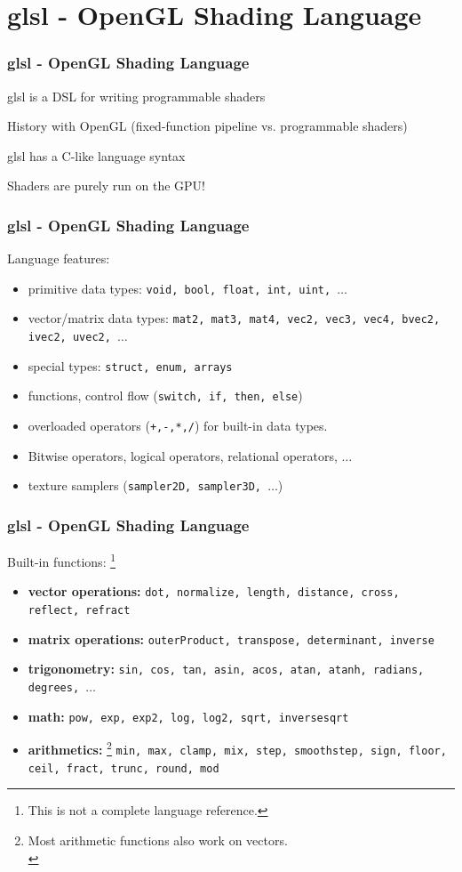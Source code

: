 \documentclass{beamer}
\begin{document}
%
%
%
\section{glsl - OpenGL Shading Language}

\begin{frame}
\frametitle{glsl - OpenGL Shading Language}
glsl is a DSL for writing programmable shaders

History with OpenGL (fixed-function pipeline vs. programmable shaders)

glsl has a C-like language syntax

Shaders are purely run on the GPU!
\end{frame}


%
%
%
\begin{frame}
\frametitle{glsl - OpenGL Shading Language}
Language features:

\begin{itemize}
\item primitive data types: \texttt{void, bool, float, int, uint, $\ldots$}
\item vector/matrix data types: \texttt{mat2, mat3, mat4, vec2, vec3, vec4,
bvec2, ivec2, uvec2, $\ldots$}
\item special types: \texttt{struct, enum, arrays}
\item functions, control flow (\texttt{switch, if, then, else})
\item overloaded operators (\texttt{+,-,*,/}) for built-in data types.
\item Bitwise operators, logical operators, relational operators, $\ldots$
\item texture samplers (\texttt{sampler2D, sampler3D, $\ldots$})
\end{itemize}
\end{frame}


%
%
%
\begin{frame}
\frametitle{glsl - OpenGL Shading Language}
Built-in functions:
\footnote{This is not a complete language reference.}

\begin{itemize}
\item \textbf{vector operations:}
\texttt{dot, normalize, length, distance, cross, reflect, refract}
\item \textbf{matrix operations:}
\texttt{outerProduct, transpose, determinant, inverse}
\item \textbf{trigonometry:}
\texttt{sin, cos, tan, asin, acos, atan, atanh, radians, degrees, $\ldots$}
\item \textbf{math:}
\texttt{pow, exp, exp2, log, log2, sqrt, inversesqrt}
\item \textbf{arithmetics:}
\footnote{Most arithmetic functions also work on vectors.\\}
\texttt{min, max, clamp, mix, step, smoothstep,
sign, floor, ceil, fract, trunc, round, mod}
\end{itemize}
\end{frame}
\end{document}
